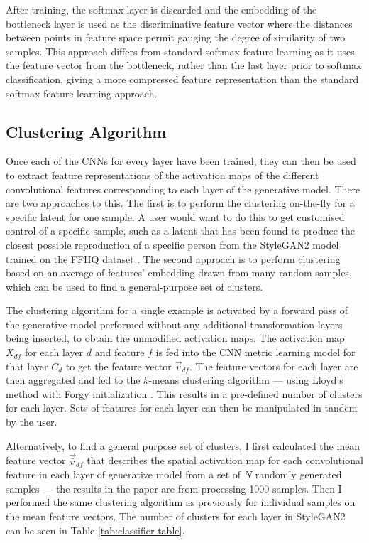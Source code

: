 After training, the softmax layer is discarded and the embedding of the bottleneck layer is used as the discriminative feature vector where the distances between points in feature space permit gauging the degree of similarity of two samples. 
This approach differs from standard softmax feature learning as it uses the feature vector from the bottleneck, rather than the last layer prior to softmax classification, giving a more compressed feature representation than the standard softmax feature learning approach.

\subsection{Clustering Algorithm}

\label{c5:sec:clustering}

Once each of the CNNs for every layer have been trained, they can then be used to extract feature representations of the activation maps of the different convolutional features corresponding to each layer of the generative model.
There are two approaches to this. The first is to perform the clustering on-the-fly for a specific latent for one sample. A user would want to do this to get customised control of a specific sample, such as a latent that has been found to produce the closest possible reproduction of a specific person from the StyleGAN2 model trained on the FFHQ dataset \citep{abdal2019image2stylegan,karras2019analyzing}. 
The second approach is to perform clustering based on an average of features' embedding drawn from many random samples, which can be used to find a general-purpose set of clusters.

The clustering algorithm for a single example is activated by a forward pass of the generative model performed without any additional transformation layers being inserted, to obtain the unmodified activation maps. 
The activation map $X_{df}$ for each layer $d$ and feature $f$ is fed into the CNN metric learning model for that layer $C_d$ to get the feature vector $\vec{v}_{df}$. 
The feature vectors for each layer are then aggregated and fed to the $k$-means clustering algorithm --- using Lloyd's method \citep{lloyd1982least} with Forgy initialization \citep{forgy1965cluster, celebi2013comparative}. 
This results in a pre-defined number of clusters for each layer. 
Sets of features for each layer can then be manipulated in tandem by the user.

Alternatively, to find a general purpose set of clusters, I first calculated the mean feature vector $\vec{\bar{v}}_{df}$ that describes the spatial activation map for each convolutional feature in each layer of generative model from a set of $N$ randomly generated samples --- the results in the paper are from processing 1000 samples. 
Then I performed the same clustering algorithm as previously for individual samples on the mean feature vectors. 
The number of clusters for each layer in StyleGAN2 can be seen in Table \ref{tab:classifier-table}.


